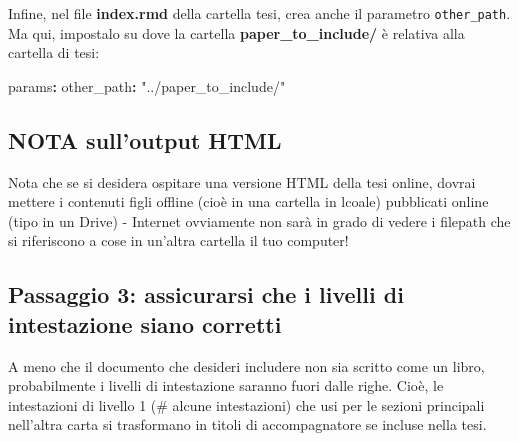 \documentclass[a4paper, 11pt, nobind]{templates/ociamthesis}
\newenvironment{Shaded}{\begin{snugshade}}{\end{snugshade}}
\newcommand{\AttributeTok}[1]{\textcolor[rgb]{0.77,0.63,0.00}{#1}}
\newcommand{\FunctionTok}[1]{\textcolor[rgb]{0.00,0.00,0.00}{#1}}
\newcommand{\KeywordTok}[1]{\textcolor[rgb]{0.13,0.29,0.53}{\textbf{#1}}}
\newcommand{\NormalTok}[1]{#1}
\newcommand{\OtherTok}[1]{\textcolor[rgb]{0.56,0.35,0.01}{#1}}
\newcommand{\SpecialCharTok}[1]{\textcolor[rgb]{0.00,0.00,0.00}{#1}}
\newcommand{\StringTok}[1]{\textcolor[rgb]{0.31,0.60,0.02}{#1}}
\renewenvironment{Shaded}
{
  \vspace{10pt}%
  \begin{snugshade}%
}{%
  \end{snugshade}%
  \vspace{8pt}%
}
\begin{document}
\begin{Shaded}
\end{Shaded}

Infine, nel file \textbf{index.rmd } della cartella tesi, crea anche il parametro \texttt{other\_path}.
Ma qui, impostalo su dove la cartella \textbf{paper\_to\_include/} è relativa alla cartella di tesi:

\begin{Shaded}
\begin{Highlighting}[]
\FunctionTok{params}\KeywordTok{:}
\AttributeTok{  }\FunctionTok{other\_path}\KeywordTok{:}\AttributeTok{ }\StringTok{"../paper\_to\_include/"}
\end{Highlighting}
\end{Shaded}

\hypertarget{nota-sulloutput-html}{%
\subsection{NOTA sull'output HTML}\label{nota-sulloutput-html}}

Nota che se si desidera ospitare una versione HTML della tesi online, dovrai mettere i contenuti figli offline (cioè in una cartella in lcoale) pubblicati online (tipo in un Drive) - Internet ovviamente non sarà in grado di vedere i filepath che si riferiscono a cose in un'altra cartella il tuo computer!

\hypertarget{passaggio-3-assicurarsi-che-i-livelli-di-intestazione-siano-corretti}{%
\subsection{Passaggio 3: assicurarsi che i livelli di intestazione siano corretti}\label{passaggio-3-assicurarsi-che-i-livelli-di-intestazione-siano-corretti}}

A meno che il documento che desideri includere non sia scritto come un libro, probabilmente i livelli di intestazione saranno fuori dalle righe.
Cioè, le intestazioni di livello 1 (\# alcune intestazioni) che usi per le sezioni principali nell'altra carta si trasformano in titoli di accompagnatore se incluse nella tesi.
\end{document}
